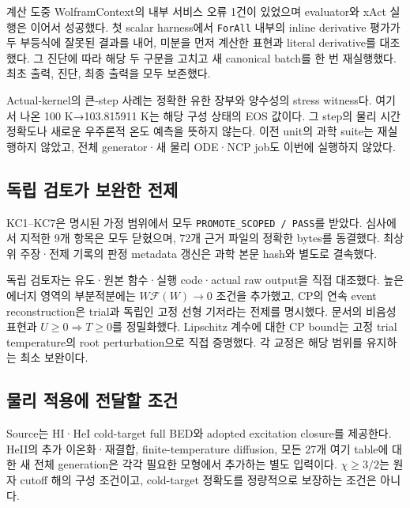 계산 도중 WolframContext의 내부 서비스 오류 1건이 있었으며 evaluator와 xAct 실행은 이어서 성공했다. 첫 scalar harness에서 \texttt{ForAll} 내부의 inline derivative 평가가 두 부등식에 잘못된 결과를 내어, 미분을 먼저 계산한 표현과 literal derivative를 대조했다. 그 진단에 따라 해당 두 구문을 고치고 새 canonical batch를 한 번 재실행했다. 최초 출력, 진단, 최종 출력을 모두 보존했다.

Actual-kernel의 큰-step 사례는 정확한 유한 장부와 양수성의 stress witness다. 여기서 나온 100 K→103.815911 K는 해당 구성 상태의 EOS 값이다. 그 step의 물리 시간 정확도나 새로운 우주론적 온도 예측을 뜻하지 않는다. 이전 unit의 과학 suite는 재실행하지 않았고, 전체 generator·새 물리 ODE·NCP job도 이번에 실행하지 않았다.

\hypertarget{uxb3c5uxb9bd-uxac80uxd1a0uxac00-uxbcf4uxc644uxd55c-uxc804uxc81c}{%
\subsection{독립 검토가 보완한 전제}\label{uxb3c5uxb9bd-uxac80uxd1a0uxac00-uxbcf4uxc644uxd55c-uxc804uxc81c}}

KC1--KC7은 명시된 가정 범위에서 모두 \texttt{PROMOTE\_SCOPED\ /\ PASS}를 받았다. 심사에서 지적한 9개 항목은 모두 닫혔으며, 72개 근거 파일의 정확한 bytes를 동결했다. 최상위 주장·전제 기록의 판정 metadata 갱신은 과학 본문 hash와 별도로 결속했다.

독립 검토자는 유도·원본 함수·실행 code·actual raw output을 직접 대조했다. 높은 에너지 영역의 부분적분에는 \(W\mathcal F(W)\to0\) 조건을 추가했고, CP의 연속 event reconstruction은 trial과 독립인 고정 선형 기저라는 전제를 명시했다. 문서의 비음성 표현과 \(U\ge0\Rightarrow T\ge0\)를 정밀화했다. Lipschitz 계수에 대한 CP bound는 고정 trial temperature의 root perturbation으로 직접 증명했다. 각 교정은 해당 범위를 유지하는 최소 보완이다.

\hypertarget{uxbb3cuxb9ac-uxc801uxc6a9uxc5d0-uxc804uxb2ecuxd560-uxc870uxac74}{%
\subsection{물리 적용에 전달할 조건}\label{uxbb3cuxb9ac-uxc801uxc6a9uxc5d0-uxc804uxb2ecuxd560-uxc870uxac74}}

Source는 HI·HeI cold-target full BED와 adopted excitation closure를 제공한다. HeII의 추가 이온화·재결합, finite-temperature diffusion, 모든 27개 여기 table에 대한 새 전체 generation은 각각 필요한 모형에서 추가하는 별도 입력이다. \(\chi\ge3/2\)는 원자 cutoff 해의 구성 조건이고, cold-target 정확도를 정량적으로 보장하는 조건은 아니다.

